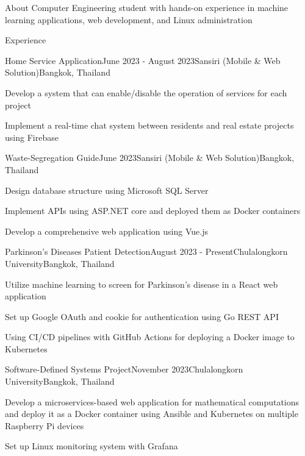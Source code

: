 \documentclass[12pt]{resume}
\begin{document}
\begin{rSection}{About}
    Computer Engineering student with hands-on experience in machine learning applications, web development, and Linux administration
\end{rSection}

\begin{rSection}{Experience}

    \begin{rSubsection}{Home Service Application}{June 2023 - August 2023}{Sansiri (Mobile \& Web Solution)}{Bangkok, Thailand}
        \item Develop a system that can enable/disable the operation of services for each project
        \item Implement a real-time chat system between residents and real estate projects using Firebase
    \end{rSubsection}

	\begin{rSubsection}{Waste-Segregation Guide}{June 2023}{Sansiri (Mobile \& Web Solution)}{Bangkok, Thailand}
        \item Design database structure using Microsoft SQL Server
        \item Implement APIs using ASP.NET core and deployed them as Docker containers
        \item Develop a comprehensive web application using Vue.js
	\end{rSubsection}

	\begin{rSubsection}{Parkinson's Diseases Patient Detection}{August 2023 - Present}{Chulalongkorn University}{Bangkok, Thailand}
        \item Utilize machine learning to screen for Parkinson's disease in a React web application
        \item Set up Google OAuth and cookie for authentication using Go REST API
        \item Using CI/CD pipelines with GitHub Actions for deploying a Docker image to Kubernetes
	\end{rSubsection}

	\begin{rSubsection}{Software-Defined Systems Project}{November 2023}{Chulalongkorn University}{Bangkok, Thailand}
        \item Develop a microservices-based web application for mathematical computations and deploy it as a Docker container using Ansible and Kubernetes on multiple Raspberry Pi devices
        \item Set up Linux monitoring system with Grafana
	\end{rSubsection}

\end{rSection}
\end{document}
